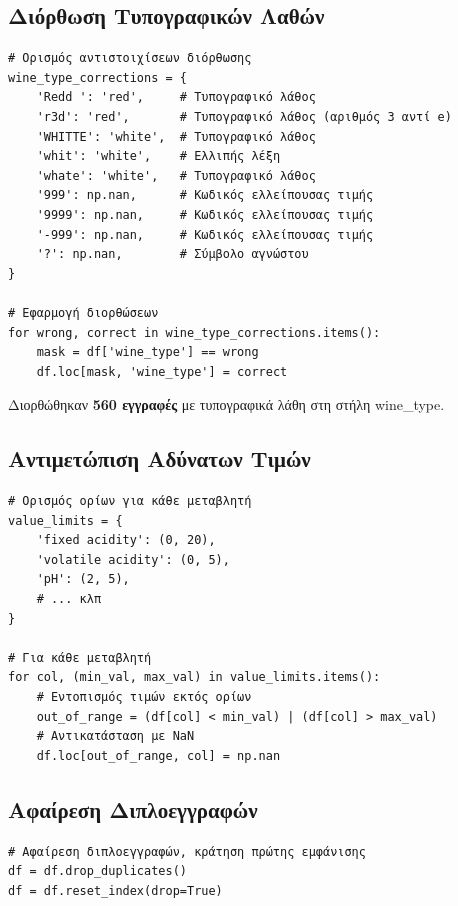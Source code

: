 \documentclass[12pt,a4paper]{article}
\begin{document}
\subsection{Διόρθωση Τυπογραφικών Λαθών}

\begin{lstlisting}[caption={Διόρθωση τυπογραφικών λαθών}]
# Ορισμός αντιστοιχίσεων διόρθωσης
wine_type_corrections = {
    'Redd ': 'red',     # Τυπογραφικό λάθος
    'r3d': 'red',       # Τυπογραφικό λάθος (αριθμός 3 αντί e)
    'WHITTE': 'white',  # Τυπογραφικό λάθος
    'whit': 'white',    # Ελλιπής λέξη
    'whate': 'white',   # Τυπογραφικό λάθος
    '999': np.nan,      # Κωδικός ελλείπουσας τιμής
    '9999': np.nan,     # Κωδικός ελλείπουσας τιμής
    '-999': np.nan,     # Κωδικός ελλείπουσας τιμής
    '?': np.nan,        # Σύμβολο αγνώστου
}

# Εφαρμογή διορθώσεων
for wrong, correct in wine_type_corrections.items():
    mask = df['wine_type'] == wrong
    df.loc[mask, 'wine_type'] = correct
\end{lstlisting}

\begin{successbox}[Αποτέλεσμα]
Διορθώθηκαν \textbf{560 εγγραφές} με τυπογραφικά λάθη στη στήλη wine\_type.
\end{successbox}

\subsection{Αντιμετώπιση Αδύνατων Τιμών}

\begin{lstlisting}[caption={Αντικατάσταση αδύνατων τιμών}]
# Ορισμός ορίων για κάθε μεταβλητή
value_limits = {
    'fixed acidity': (0, 20),
    'volatile acidity': (0, 5),
    'pH': (2, 5),
    # ... κλπ
}

# Για κάθε μεταβλητή
for col, (min_val, max_val) in value_limits.items():
    # Εντοπισμός τιμών εκτός ορίων
    out_of_range = (df[col] < min_val) | (df[col] > max_val)
    # Αντικατάσταση με NaN
    df.loc[out_of_range, col] = np.nan
\end{lstlisting}

\subsection{Αφαίρεση Διπλοεγγραφών}

\begin{lstlisting}[caption={Αφαίρεση διπλοεγγραφών}]
# Αφαίρεση διπλοεγγραφών, κράτηση πρώτης εμφάνισης
df = df.drop_duplicates()
df = df.reset_index(drop=True)
\end{lstlisting}
\end{document}

